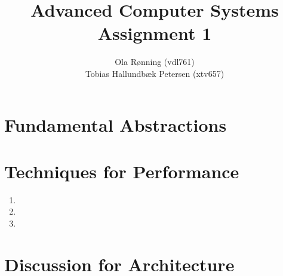 \documentclass[a4paper]{article}
\author{Ola Rønning (vdl761) \\ Tobias Hallundbæk Petersen (xtv657)}
\title{Advanced Computer Systems \\ Assignment 1}
\begin{document}
\maketitle
\section{Fundamental Abstractions}

\section{Techniques for Performance}
\begin{enumerate}
\item 
\item 
\item 
\end{enumerate}
\section{Discussion for Architecture}
\end{document}
